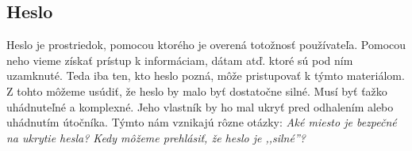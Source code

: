 \subsection{Heslo}
Heslo je prostriedok, pomocou ktorého je overená totožnosť používateľa. \cite{heslo} Pomocou neho vieme získať prístup k informáciam, dátam atď. ktoré sú pod ním uzamknuté. Teda iba ten, kto heslo pozná, môže pristupovať k týmto materiálom. Z tohto môžeme usúdiť, že heslo by malo byť dostatočne silné. Musí byť ťažko uhádnuteľné a komplexné. Jeho vlastník by ho mal ukryť pred odhalením alebo uhádnutím útočníka. Týmto nám vznikajú rôzne otázky: \textit{Aké miesto je bezpečné na ukrytie hesla? Kedy môžeme prehlásiť, že heslo je ,,silné''?}